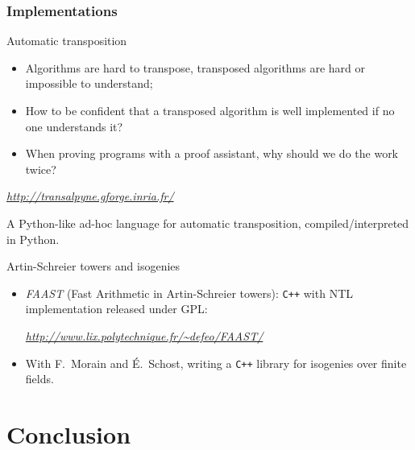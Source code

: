\documentclass[10pt,usepdftitle=false]{beamer}
\begin{document}
\begin{frame}
  \frametitle{Implementations}


  \begin{block}{Automatic transposition}
    \begin{itemize}
    \item Algorithms are hard to transpose, transposed algorithms are
      hard or impossible to understand;
    \item How to be confident that a transposed algorithm is well
      implemented if no one understands it?
    \item When proving programs with a proof assistant, why should we do
      the work twice?
    \end{itemize}

    \hfill\emph{\url{http://transalpyne.gforge.inria.fr/}}\hfill\strut

    A Python-like ad-hoc language for automatic transposition,
    compiled/interpreted in Python.
  \end{block}
  
  \begin{block}{Artin-Schreier towers and isogenies}
    \begin{itemize}
    \item \emph{FAAST} (Fast Arithmetic in Artin-Schreier towers):
      \texttt{C++} with NTL implementation released under GPL:

      \hfill\emph{\url{http://www.lix.polytechnique.fr/~defeo/FAAST/}}\hfill\strut
    \item With F.~Morain and É.~Schost, writing a \texttt{C++} library
      for isogenies over finite fields.
    \end{itemize}
  \end{block}
\end{frame}


\section{Conclusion}
\end{document}
